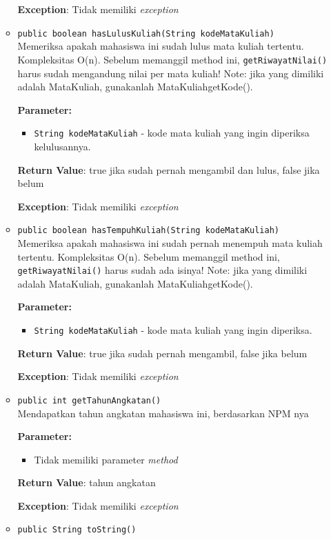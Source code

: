 \documentclass{article}
\begin{document}
\begin{enumerate}
\begin{itemize}
\textbf{Exception}: Tidak memiliki \textit{exception}

\item \texttt{public boolean hasLulusKuliah(String kodeMataKuliah)}\\ 
Memeriksa apakah mahasiswa ini sudah lulus mata kuliah tertentu. Kompleksitas O(n).
 Sebelum memanggil method ini, \texttt{getRiwayatNilai()} harus sudah mengandung nilai per mata kuliah!
 Note: jika yang dimiliki adalah MataKuliah, gunakanlah MataKuliahgetKode().

\textbf{Parameter:}
\begin{itemize}
\item \texttt{String kodeMataKuliah} - 
kode mata kuliah yang ingin diperiksa kelulusannya.
\end{itemize}
\textbf{Return Value}: true jika sudah pernah mengambil dan lulus, false jika belum

\textbf{Exception}: Tidak memiliki \textit{exception}

\item \texttt{public boolean hasTempuhKuliah(String kodeMataKuliah)}\\ 
Memeriksa apakah mahasiswa ini sudah pernah menempuh mata kuliah tertentu. Kompleksitas O(n).
 Sebelum memanggil method ini, \texttt{getRiwayatNilai()} harus sudah ada isinya!
 Note: jika yang dimiliki adalah MataKuliah, gunakanlah MataKuliahgetKode().

\textbf{Parameter:}
\begin{itemize}
\item \texttt{String kodeMataKuliah} - 
kode mata kuliah yang ingin diperiksa.
\end{itemize}
\textbf{Return Value}: true jika sudah pernah mengambil, false jika belum

\textbf{Exception}: Tidak memiliki \textit{exception}

\item \texttt{public int getTahunAngkatan()}\\ 
Mendapatkan tahun angkatan mahasiswa ini, berdasarkan NPM nya

\textbf{Parameter:}\begin{itemize}
\item Tidak memiliki parameter \textit{method}
\end{itemize}
\textbf{Return Value}: tahun angkatan

\textbf{Exception}: Tidak memiliki \textit{exception}

\item \texttt{public String toString()}\\ 



\end{itemize}
\end{enumerate}
\end{document}
